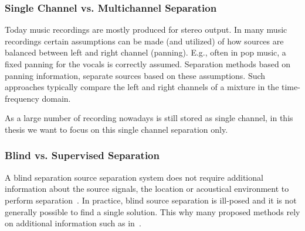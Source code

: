 \subsubsection*{Single Channel vs. Multichannel Separation}

Today music recordings are mostly produced for stereo output. 
In many music recordings certain assumptions can be made (and utilized) of how sources are balanced between left and right channel (panning). 
E.g., often in pop music, a fixed panning for the vocals is correctly assumed.
Separation methods based on panning information, separate sources based on these assumptions. Such approaches typically compare the left and right channels of a mixture in the time-frequency domain.
\par
As a large number of recording nowadays is still stored as single channel, in this thesis we want to focus on this single channel separation only.

\subsubsection*{Blind vs. Supervised Separation}
A blind separation source separation system does not require additional information about the source signals, the location or acoustical environment to perform separation~\cite{makino07}.
In practice, blind source separation is ill-posed and it is not generally possible to find a single solution.
This why many proposed methods rely on additional information such as in~\cite{liutkus13, ewert14}.

